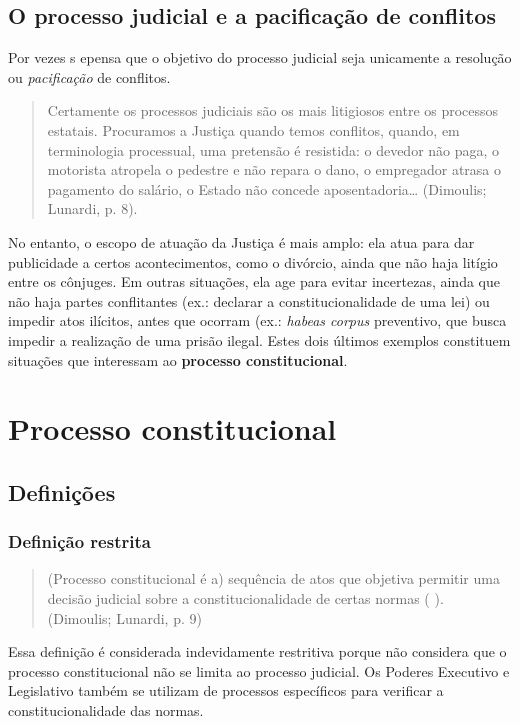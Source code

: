 \documentclass{article}
\begin{document}
\subsection{O processo judicial e a pacificação de conflitos}

Por vezes s epensa que o objetivo do processo judicial seja unicamente a resolução ou \textit{pacificação} de conflitos.

\begin{quote}
    Certamente os processos judiciais são os mais litigiosos entre os processos estatais. Procuramos a Justiça quando temos conflitos, quando, em terminologia processual, uma pretensão é resistida: o devedor não paga, o motorista atropela o pedestre e não repara o dano, o empregador atrasa o pagamento do salário, o Estado não concede aposentadoria… (Dimoulis; Lunardi, p. 8).
\end{quote}

No entanto, o escopo de atuação da Justiça é mais amplo: ela atua para dar publicidade a certos acontecimentos, como o divórcio, ainda que não haja litígio entre os cônjuges. Em outras situações, ela age para evitar incertezas, ainda que não haja partes conflitantes (ex.: declarar a constitucionalidade de uma lei) ou impedir atos ilícitos, antes que ocorram (ex.: \textit{habeas corpus} preventivo, que busca impedir a realização de uma prisão ilegal. Estes dois últimos exemplos constituem situações que interessam ao \textbf{processo constitucional}.

\section{Processo constitucional}

\subsection{Definições}

\subsubsection{Definição restrita}

\begin{quote}
    (Processo constitucional é a) sequência de atos que objetiva permitir uma decisão judicial sobre a constitucionalidade de certas normas ( ). (Dimoulis; Lunardi, p. 9)
\end{quote}

Essa definição é considerada indevidamente restritiva porque não considera que o processo constitucional não se limita ao processo judicial. Os Poderes Executivo e Legislativo também se utilizam de processos específicos para verificar a constitucionalidade das normas.
\end{document}
